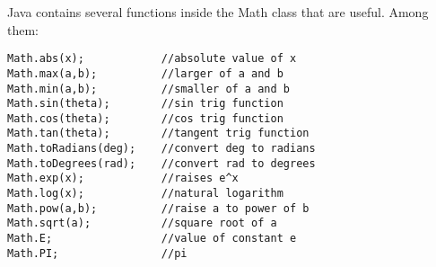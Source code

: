 \documentclass[paper=a4, fontsize=11pt, parskip=full]{scrartcl} %
\numberwithin{equation}{section} %
\numberwithin{figure}{section} %
\numberwithin{table}{section} %
\begin{document}
Java contains several functions inside the Math class that are useful. Among them:

\begin{lstlisting}
Math.abs(x);			//absolute value of x
Math.max(a,b);			//larger of a and b
Math.min(a,b);			//smaller of a and b
Math.sin(theta);		//sin trig function
Math.cos(theta);		//cos trig function
Math.tan(theta);		//tangent trig function
Math.toRadians(deg);	//convert deg to radians
Math.toDegrees(rad);	//convert rad to degrees
Math.exp(x);			//raises e^x
Math.log(x);			//natural logarithm
Math.pow(a,b);			//raise a to power of b
Math.sqrt(a);			//square root of a
Math.E;					//value of constant e
Math.PI;				//pi
\end{lstlisting}




\end{document}
